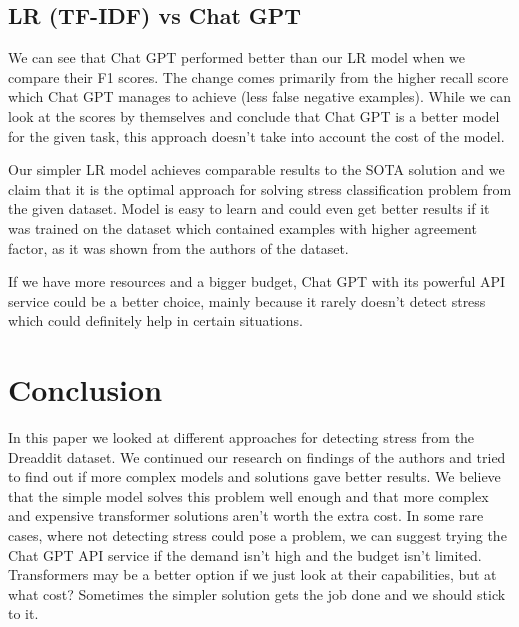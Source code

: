 \documentclass[10pt, a4paper]{article}
\begin{document}
\subsection{LR (TF-IDF) vs Chat GPT}
We can see that Chat GPT performed better than our LR model when we compare their F1 scores.
The change comes primarily from the higher recall score which Chat GPT manages to achieve (less false negative examples).
While we can look at the scores by themselves and conclude that Chat GPT is a better model for the given task, this approach doesn't take into account the cost of the model.

Our simpler LR model achieves comparable results to the SOTA solution and we claim that it is the optimal approach for solving stress classification problem from the given dataset.
Model is easy to learn and could even get better results if it was trained on the dataset which contained examples with higher agreement factor, as it was shown from the authors of the dataset.

If we have more resources and a bigger budget, Chat GPT with its powerful API service could be a better choice, mainly because it rarely doesn't detect stress which could definitely help in certain situations.
\section{Conclusion}

In this paper we looked at different approaches for detecting stress from the Dreaddit dataset.
We continued our research on findings of the authors and tried to find out if more complex models and solutions gave better results.
\hfill \break
\hfill \break
We believe that the simple model solves this problem well enough and that more complex and expensive transformer solutions aren't worth the extra cost.
In some rare cases, where not detecting stress could pose a problem, we can suggest trying the Chat GPT API service if the demand isn't high and the budget isn't limited.
Transformers may be a better option if we just look at their capabilities, but at what cost?
Sometimes the simpler solution gets the job done and we should stick to it.



\end{document}
